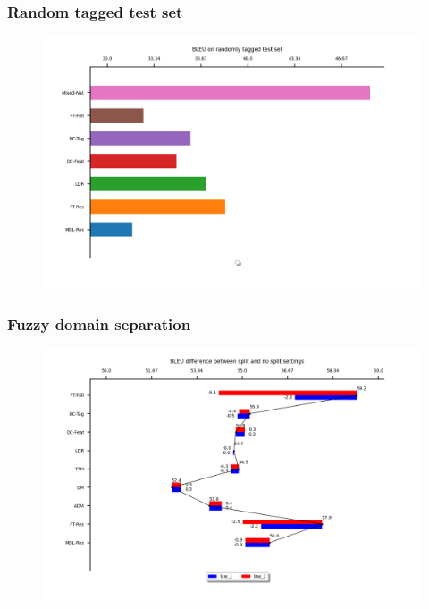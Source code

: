 \documentclass{beamer}
\begin{document}
\begin{frame}
\frametitle{Random tagged test set}
\begin{figure}
\includegraphics[width=\textwidth]{random_tag.png}
\end{figure}
\end{frame}

\begin{frame}
\frametitle{Fuzzy domain separation}
\begin{figure}
\includegraphics[width=\textwidth]{fuzzy_split.png}
\end{figure}
\end{frame}
\end{document}
